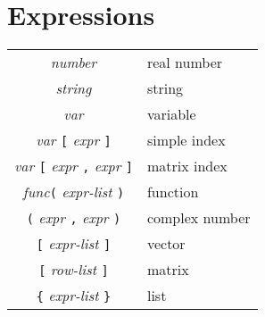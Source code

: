 \documentclass{article}
\begin{document}
\section{Expressions}
\begin{center}
  \begin{tabular}{cl}
    \emph{number} & real number \\
    \emph{string} & string \\
    \emph{var} & variable \\
    \emph{var} \verb|[| \emph{expr} \verb|]| & simple index \\
    \emph{var} \verb|[| \emph{expr} \verb|,| \emph{expr} \verb|]| & matrix index \\
    \emph{func}\verb|(| \emph{expr-list} \verb|)| & function \\
    \verb|(| \emph{expr} \verb|,| \emph{expr} \verb|)| & complex number \\

    \verb|[| \emph{expr-list} \verb|]| & vector \\
    \verb|[| \emph{row-list} \verb|]| & matrix \\
    \verb|{| \emph{expr-list} \verb|}| & list \\
  \end{tabular}
\end{center}
\end{document}
